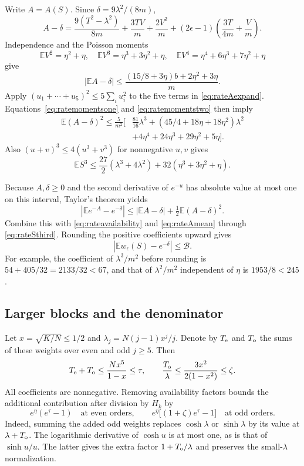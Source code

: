 \documentclass[11pt]{article}
\theoremstyle{definition}
\theoremstyle{remark}
\newcommand{\E}{\mathbb E}
\newcommand{\1}{\mathbf 1}
\begin{document}
Write $A=A(S)$. Since $\delta=9\lambda^2/(8m)$,
\begin{equation}\label{eq:rateAexpand}
A-\delta
=\frac{9(T^2-\lambda^2)}{8m}+\frac{3TV}{m}+\frac{2V^2}{m}
+(2\epsilon-1)\left(\frac{3T}{4m}+\frac Vm\right).
\end{equation}
Independence and the Poisson moments
\[
\E V^2=\eta^2+\eta,\quad
\E V^3=\eta^3+3\eta^2+\eta,\quad
\E V^4=\eta^4+6\eta^3+7\eta^2+\eta
\]
give
\begin{equation}\label{eq:rateAmean}
|\E A-\delta|
\le\frac{(15/8+3\eta)b+2\eta^2+3\eta}{m}.
\end{equation}
Apply $(u_1+\cdots+u_5)^2\le5\sum_i u_i^2$ to the five terms in \eqref{eq:rateAexpand}. Equations~\eqref{eq:ratemomentsone} and \eqref{eq:ratemomentstwo} then imply
\begin{equation}\label{eq:rateAsecond}
\begin{aligned}
\E(A-\delta)^2\le\frac5{m^2}\bigl[&\frac{81}{16}\lambda^3
+(45/4+18\eta+18\eta^2)\lambda^2\\
&+4\eta^4+24\eta^3+29\eta^2+5\eta\bigr].
\end{aligned}
\end{equation}
Also $(u+v)^3\le4(u^3+v^3)$ for nonnegative $u,v$ gives
\begin{equation}\label{eq:rateSthird}
\E S^3\le\frac{27}{2}(\lambda^3+4\lambda^2)
+32(\eta^3+3\eta^2+\eta).
\end{equation}

Because $A,\delta\ge0$ and the second derivative of $e^{-u}$ has absolute value at most one on this interval, Taylor's theorem yields
\[
|\E e^{-A}-e^{-\delta}|
\le|\E A-\delta|+\tfrac12\E(A-\delta)^2.
\]
Combine this with \eqref{eq:rateavailability} and \eqref{eq:rateAmean} through \eqref{eq:rateSthird}. Rounding the positive coefficients upward gives
\begin{equation}\label{eq:ratewerror}
|\E w_\epsilon(S)-e^{-\delta}|\le\mathcal B.
\end{equation}
For example, the coefficient of $\lambda^3/m^2$ before rounding is $54+405/32=2133/32<67$, and that of $\lambda^2/m^2$ independent of $\eta$ is $1953/8<245$.

\subsection{Larger blocks and the denominator}

Let $x=\sqrt{K/N}\le1/2$ and $\lambda_j=N(j-1)x^j/j$. Denote by $T_{\rm e}$ and $T_{\rm o}$ the sums of these weights over even and odd $j\ge5$. Then
\[
T_{\rm e}+T_{\rm o}\le\frac{Nx^5}{1-x}\le\tau,
\qquad
\frac{T_{\rm o}}\lambda\le\frac{3x^2}{2(1-x^2)}\le\zeta.
\]
All coefficients are nonnegative. Removing availability factors bounds the additional contribution after division by $H_k$ by
\[
e^\eta(e^\tau-1)
\quad\text{at even orders},\qquad
e^\eta\bigl[(1+\zeta)e^\tau-1\bigr]
\quad\text{at odd orders}.
\]
Indeed, summing the added odd weights replaces $\cosh\lambda$ or $\sinh\lambda$ by its value at $\lambda+T_{\rm o}$. The logarithmic derivative of $\cosh u$ is at most one, as is that of $\sinh u/u$. The latter gives the extra factor $1+T_{\rm o}/\lambda$ and preserves the small-$\lambda$ normalization.
\end{document}
